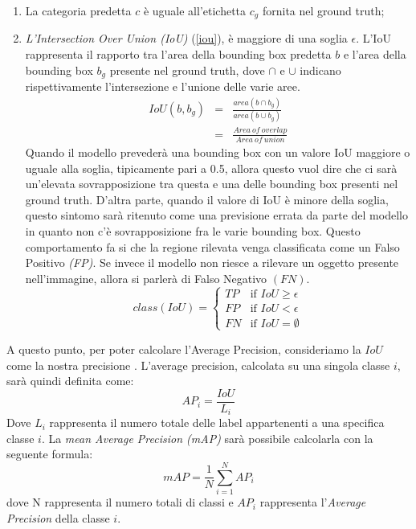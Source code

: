 \begin{enumerate}
    \item La categoria predetta $c$ è uguale all’etichetta $c_g$ fornita nel ground truth;
    \item \emph{L'Intersection Over Union (IoU)} (\ref{iou}), è maggiore di una soglia $\epsilon$. L'IoU 
    rappresenta il rapporto tra l'area della bounding box predetta $b$ e l'area 
    della bounding box $b_g$ presente nel ground truth, dove $\cap$ e $\cup$ indicano 
    rispettivamente l’intersezione e l’unione delle varie aree.
    \begin{eqnarray}\label{iou}
        IoU(b,b_g) & = & \frac{area(b \cap b_g)}{area(b \cup b_g)} \nonumber \\
                 & = & \frac{Area \ of \ overlap}{Area \ of \ union}
    \end{eqnarray}
    Quando il modello prevederà una bounding box con un valore IoU maggiore 
    o uguale alla soglia,  tipicamente pari a 0.5, allora questo vuol dire che ci 
    sarà un’elevata sovrapposizione tra questa e una delle bounding box presenti 
    nel ground truth. D’altra parte, quando il valore di IoU è minore della 
    soglia, questo sintomo sarà ritenuto come una previsione errata da parte 
    del modello in quanto non c’è sovrapposizione fra le varie bounding box. 
    Questo comportamento fa si che la regione rilevata venga classificata come 
    un Falso Positivo \emph{(FP)}. Se invece il modello non riesce a rilevare un oggetto 
    presente nell’immagine, allora si parlerà di Falso Negativo $(FN)$.
    \begin{equation}\label{iou values}
        class(IoU) = \left\{
            \begin{array}{rl}
            TP & \mbox{if } IoU \geq \epsilon \\
            FP & \mbox{if } IoU < \epsilon \\
            FN & \mbox{if } IoU = \emptyset
            \end{array}
            \right.
    \end{equation}
\end{enumerate}
A questo punto, per poter calcolare l’Average Precision, consideriamo la $IoU$ come 
la nostra precisione \cite{rosebrock2017deep}. L’average precision, calcolata su una singola classe $i$, sarà 
quindi definita come:
\begin{equation}\label{average precision}
    AP_i = \frac{IoU}{L_i}
\end{equation}
Dove $L_i$ rappresenta il numero totale delle label appartenenti a una specifica classe 
$i$. La \emph{mean Average Precision (mAP)} sarà possibile calcolarla con la seguente formula:
\begin{equation}\label{mean average precision}
    mAP = \frac{1}{N}\sum_{i=1}^NAP_i
\end{equation}
dove N rappresenta il numero totali di classi e $AP_i$ rappresenta l'\emph{Average Precision} 
della classe $i$.

